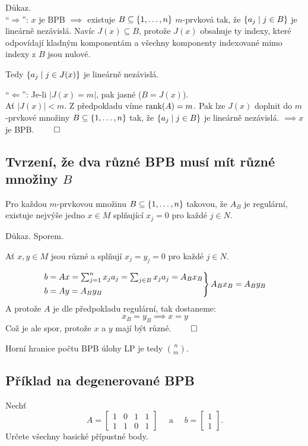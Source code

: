 Důkaz.\\
\enquote{$\Rightarrow$}: $x$ je BPB $\implies$ existuje $B \subseteq \left\lbrace 1, \dots, n \right\rbrace$ $m$-prvková tak, že
$\left\lbrace a_j \mid j \in B \right\rbrace$ je lineárně nezávislá. Navíc $J(x) \subseteq B$, protože $J(x)$ obsahuje ty indexy, které
odpovídají kladným komponentám a všechny komponenty indexované mimo indexy z $B$ jsou nulové.

Tedy $\left\lbrace a_j \mid j \in J(x) \right\rbrace$ je lineárně nezávislá.

\enquote{$\Leftarrow$}: Je-li $|J(x) = m|$, pak jasné ($B = J(x)$).\\
Ať $|J(x)| < m$. Z předpokladu víme $\operatorname*{rank}(A) = m$. Pak lze $J(x)$ doplnit do $m$-prvkové množiny
$B \subseteq \left\lbrace 1,\dots, n \right\rbrace$ tak, že $\left\lbrace a_j \mid j \in B \right\rbrace$ je lineárně nezávislá. $\implies x$ je BPB. $\qed$

\subsection{Tvrzení, že dva různé BPB musí mít různé množiny \texorpdfstring{$B$}{B}} \label{ruzneBPB}
Pro každou $m$-prvkovou množinu $B \subseteq \left\lbrace 1, \dots, n \right\rbrace$ takovou, že $A_B$ je regulární, existuje nejvýše jedno
$x \in M$ splňující $x_j = 0$ pro každé $j \in N$.

Důkaz. Sporem.

Ať $x, y \in M$ jsou různé a splňují $x_j = y_j = 0$ pro každé $j \in N$.

\[
    \begin{rcases}
        b = Ax = \sum_{j = 1}^{n} x_j a_j = \sum_{j \in B}x_j a_j = A_B x_B \\
        b = Ay = A_B y_B
    \end{rcases} A_B x_B = A_B y_B
\]
A protože $A$ je dle předpokladu regulární, tak dostaneme:
\[
    x_B = y_B \implies x = y
\]
Což je ale spor, protože $x$ a $y$ mají být různé. $\qed$

Horní hranice počtu BPB úlohy LP je tedy $\binom{n}{m}$.

\subsection{Příklad na degenerované BPB}
Nechť
\[
    A =
    \begin{bmatrix}
    1 & 0 & 1 & 1 \\
    1 & 1 & 0 & 1
    \end{bmatrix} \quad \text{ a } \quad b =
    \begin{bmatrix}
        1 \\
        1
    \end{bmatrix}.
\]
Určete všechny basické přípustné body.

